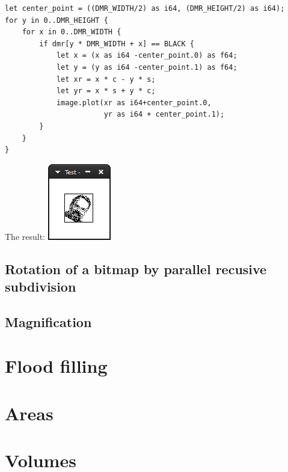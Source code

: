 \documentclass[12pt,a4,oneside,usenames,dvipsnames]{book}
\newcommand\bitmap{{\pixel{}bitmap}}
\begin{document}
\begin{verbatim}
let center_point = ((DMR_WIDTH/2) as i64, (DMR_HEIGHT/2) as i64);
for y in 0..DMR_HEIGHT {
    for x in 0..DMR_WIDTH {
        if dmr[y * DMR_WIDTH + x] == BLACK {
            let x = (x as i64 -center_point.0) as f64;
            let y = (y as i64 -center_point.1) as f64;
            let xr = x * c - y * s;
            let yr = x * s + y * c;
            image.plot(xr as i64+center_point.0,
                       yr as i64 + center_point.1);
        }
    }
}
\end{verbatim}

The result: \includegraphics{figures/ch11-3.png}

\chapter{Rotation of a \bitmap{} by parallel recusive subdivision}
\chapter{Magnification}
\part{Flood filling}
\part{Areas}
\part{Volumes}
\end{document}
